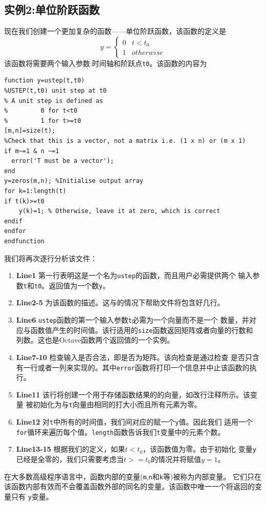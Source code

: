 \documentclass[UTF8,adobefonts]{ctexart}
\begin{document}
\subsection{实例2:单位阶跃函数}
现在我们创建一个更加复杂的函数——单位阶跃函数，该函数的定义是
\[
y=\begin{cases}
 0 & t<t_0 \\
 1 & otherwise 
\end{cases}
\]
该函数将需要两个输入参数:时间轴和阶跃点{\tt t0}。该函数的内容为
\begin{verbatim}
function y=ustep(t,t0)
%USTEP(t,t0) unit step at t0
% A unit step is defined as
%         0 for t<t0
%         1 for t>=t0
[m,n]=size(t);
%Check that this is a vector, not a matrix i.e. (1 x n) or (m x 1)
if m~=1 & n ~=1
  error('T must be a vector');
end
y=zeros(m,n); %Initialise output array
for k=1:length(t)
if t(k)>=t0
    y(k)=1; % Otherwise, leave it at zero, which is correct
endif
endfor
endfunction
\end{verbatim}
我们将再次逐行分析该文件：
\begin{enumerate}
 \item {\bf Line1} 第一行表明这是一个名为{\tt ustep}的函数，而且用户必需提供两个
输入参数{\tt t}和{\tt t0}。返回值为一个数{\tt y}。
 \item {\bf Line2-5} 为该函数的描述。这与的情况下帮助文件将包含好几行。
 \item {\bf Line6} {\tt ustep}函数的第一个输入参数{\tt t}必需为一个向量而不是一个
数量，并对应与函数值产生的时间值。该行适用的{\tt size}函数返回矩阵或者向量的行数和
列数。这也是Octave函数两个返回值的一个实例。
 \item {\bf Line7-10} 检查输入{\tt }是否合法，即是否为矩阵。该向检查是通过检查{\tt}
是否只含有一行或者一列来实现的。其中{\tt error}函数将打印一个信息并中止该函数的执行。
 \item {\bf Line11} 该行将创建一个用于存储函数结果的的向量，如改行注释所示。该变量
被初始化为与{\tt t}向量由相同的打大小而且所有元素为零。
 \item {\bf Line12} 对{\tt t}中所有的时间值，我们间对应的赋一个{\tt y}值。因此我们
适用一个{\tt for}循环来遍历每个值。{\tt length}函数告诉我们{\tt t}变量中的元素个数。
 \item {\bf Line13-15} 根据我们的定义，如果$t<t_0$，该函数值为零。由于初始化
变量{\tt y}已经是全零的，我们只需要考虑当$t>=t_0$的情况并将赋值$y=1$。 
\end{enumerate}
在大多数高级程序语言中，函数内部的变量({\tt m},{\tt n}和{\tt k}等)被称为内部变量。
它们只在该函数内部有效而不会覆盖函数外部的同名的变量。该函数中唯一一个将返回的变量只有
{\tt y}变量。
\end{document}
